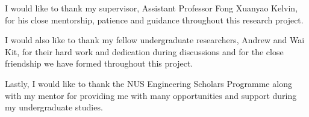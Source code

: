 \begin{acknowledgments}

    I would like to thank my supervisor, Assistant Professor Fong Xuanyao Kelvin, for his close mentorship, patience and guidance throughout this research project.

    I would also like to thank my fellow undergraduate researchers, Andrew and Wai Kit, for their hard work and dedication during discussions and for the close friendship we have formed throughout this project.
    
    Lastly, I would like to thank the NUS Engineering Scholars Programme along with my mentor for providing me with many opportunities and support during my undergraduate studies.
    
\end{acknowledgments}
